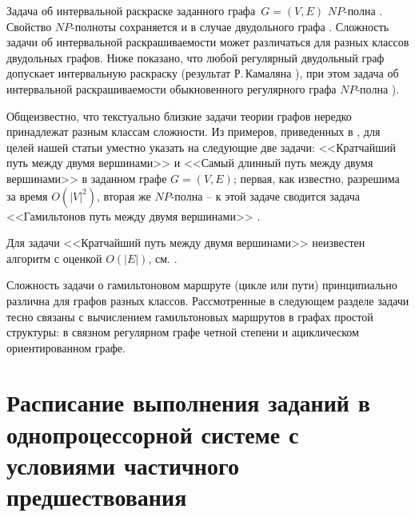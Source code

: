 Задача об интервальной раскраске заданного графа\ $G=(V,E)$ $NP$-полна \cite{akm-2}. Свойство $NP$-полноты сохраняется и в случае двудольного графа \cite{akm-8Seva}. Сложность задачи об интервальной раскрашиваемости может различаться для разных классов двудольных графов. Ниже показано, что любой регулярный двудольный граф допускает интервальную раскраску (результат Р.\,Камаляна \cite{akm-9Kamal}), при этом задача об интервальной раскрашиваемости обыкновенного регулярного графа $NP$-полна \cite{akm-2}).
\par\medskip
Общеизвестно, что текстуально близкие задачи теории графов нередко принадлежат разным классам сложности. Из примеров, приведенных в \cite[с.\,104]{akm-10Geri}, для целей нашей статьи уместно указать на следующие две задачи: <<Кратчайший путь между двумя вершинами>> и <<Самый длинный путь между двумя вершинами>> в заданном графе $G=(V,E)$; первая, как известно, разрешима за время $O(|V|^2)$, вторая же $NP$-полна -- к этой задаче сводится задача <<Гамильтонов путь между двумя вершинами>> \cite[с.\,269]{akm-10Geri}.
\par\medskip
\begin{remark}\label{lab1}
 Для задачи <<Кратчайший путь между двумя вершинами>> неизвестен алгоритм с оценкой $O(|E|)$, см. \cite[c.\,236]{akm-11Aho}.
\end{remark}
\par\medskip
Сложность задачи о гамильтоновом маршруте (цикле или пути) принципиально различна для графов разных классов. Рассмотренные в следующем разделе задачи тесно связаны с вычислением гамильтоновых маршрутов в графах простой структуры: в связном регулярном графе четной степени и ациклическом ориентированном графе.
\par\medskip
\section{Расписание выполнения заданий в однопроцессорной системе с условиями частичного предшествования}\label{akm-ss1}
\label{sec1}
